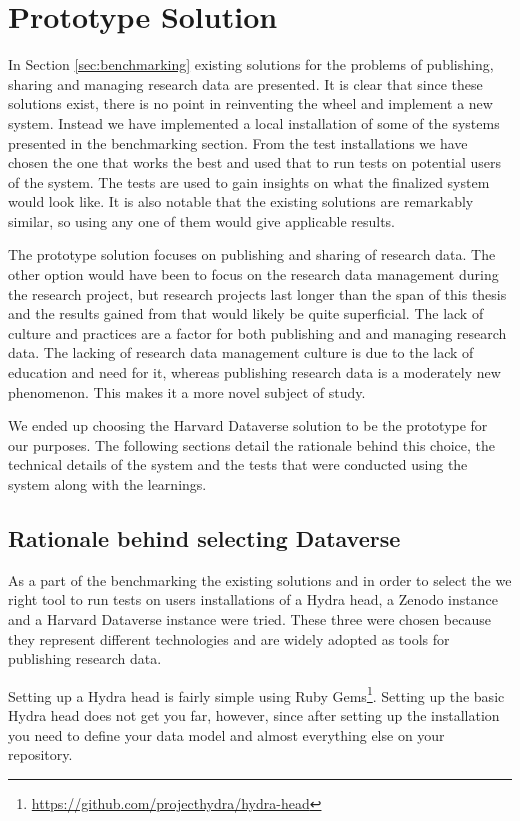 \chapter{Prototype Solution}
\label{chapter:prototype}

In Section \ref{sec:benchmarking} existing solutions for the problems of
publishing, sharing and managing research data are presented. It is clear that
since these solutions exist, there is no point in reinventing the wheel and
implement a new system. Instead we have implemented a local installation
of some of the systems presented in the benchmarking section. From the test
installations we have chosen the one that works the best and used that to
run tests on potential users of the system. The tests are used to gain insights
on what the finalized system would look like. It is also notable
that the existing solutions are remarkably similar, so using any one of them
would give applicable results.

The prototype solution focuses on publishing and sharing of research data. The
other option would have been to focus on the research data management during
the research project, but research projects last longer than the span of this
thesis and the results gained from that would likely be quite superficial.
The lack of culture and practices are a factor for both publishing and
and managing research data. The lacking of research data management culture is
due to the lack of education and need for it, whereas publishing research data
is a moderately new phenomenon. This makes it a more novel subject
of study.

We ended up choosing the Harvard Dataverse solution to be the prototype for our
purposes. The following sections detail the rationale behind this choice, the
technical details of the system and the tests that were conducted using the
system along with the learnings.

\section{Rationale behind selecting Dataverse}

As a part of the benchmarking the existing solutions and in order to select the
we right tool to run tests on users installations of a Hydra head, a
Zenodo instance and a Harvard Dataverse instance were tried. These three were chosen
because they represent different technologies and are widely adopted as tools
for publishing research data.

Setting up a Hydra head is fairly simple using Ruby
Gems\footnote{\url{https://github.com/projecthydra/hydra-head}}.
Setting up the basic Hydra head
does not get you far, however, since after setting up the installation you need
to define your data model and almost everything else on your repository.


